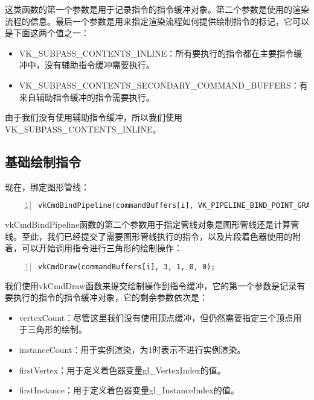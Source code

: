 \documentclass{ctexart}
\begin{document}
这类函数的第一个参数是用于记录指令的指令缓冲对象。第二个参数是使用的渲染流程的信息。最后一个参数是用来指定渲染流程如何提供绘制指令的标记，它可以是下面这两个值之一：

\begin{itemize}
	\item VK\_SUBPASS\_CONTENTS\_INLINE：所有要执行的指令都在主要指令缓冲中，没有辅助指令缓冲需要执行。
	\item VK\_SUBPASS\_CONTENTS\_SECONDARY\_COMMAND\_BUFFERS：有来自辅助指令缓冲的指令需要执行。
\end{itemize}

由于我们没有使用辅助指令缓冲，所以我们使用VK\_SUBPASS\_CONTENTS\_INLINE。

\subsection{基础绘制指令}

现在，绑定图形管线：

\begin{lstlisting}[language={[ANSI]C},keywordstyle=\color{blue!70},commentstyle=\color{red!50!green!50!blue!50},frame=shadowbox, rulesepcolor=\color{red!20!green!20!blue!20},basicstyle=\small,numbers=left, numberstyle=\tiny,breaklines=true]
vkCmdBindPipeline(commandBuffers[i], VK_PIPELINE_BIND_POINT_GRAPHICS, graphicsPipeline);
\end{lstlisting}

vkCmdBindPipeline函数的第二个参数用于指定管线对象是图形管线还是计算管线。至此，我们已经提交了需要图形管线执行的指令，以及片段着色器使用的附着，可以开始调用指令进行三角形的绘制操作：

\begin{lstlisting}[language={[ANSI]C},keywordstyle=\color{blue!70},commentstyle=\color{red!50!green!50!blue!50},frame=shadowbox, rulesepcolor=\color{red!20!green!20!blue!20},basicstyle=\small,numbers=left, numberstyle=\tiny,breaklines=true]
vkCmdDraw(commandBuffers[i], 3, 1, 0, 0);
\end{lstlisting}

我们使用vkCmdDraw函数来提交绘制操作到指令缓冲，它的第一个参数是记录有要执行的指令的指令缓冲对象，它的剩余参数依次是：

\begin{itemize}
	\item vertexCount：尽管这里我们没有使用顶点缓冲，但仍然需要指定三个顶点用于三角形的绘制。
	\item instanceCount：用于实例渲染，为1时表示不进行实例渲染。
	\item firstVertex：用于定义着色器变量gl\_VertexIndex的值。
	\item firstInstance：用于定义着色器变量gl\_InstanceIndex的值。
\end{itemize}
\end{document}
